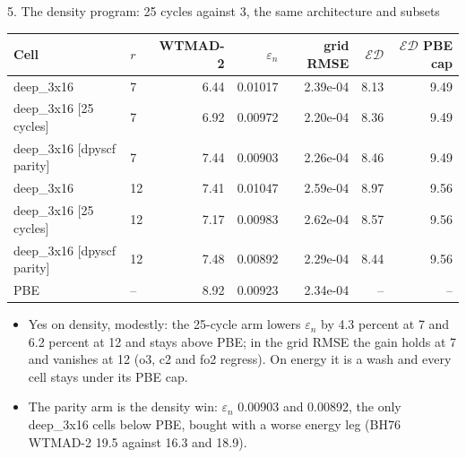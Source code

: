 \begin{frame}{5. The density program: 25 cycles against 3, the same architecture and subsets}
  \begin{center}\small\setlength{\tabcolsep}{4pt}
  \begin{tabular}{llrrrrr}
  \toprule
  Cell & $r$ & WTMAD-2 & $\varepsilon_n$ & grid RMSE & $\mathcal{ED}$ & $\mathcal{ED}$ PBE cap \\ \midrule
  deep\_3x16 & 7 & 6.44 & 0.01017 & 2.39e-04 & 8.13 & 9.49 \\
  deep\_3x16 [25 cycles] & 7 & 6.92 & 0.00972 & 2.20e-04 & 8.36 & 9.49 \\
  deep\_3x16 [dpyscf parity] & 7 & 7.44 & 0.00903 & 2.26e-04 & 8.46 & 9.49 \\
  deep\_3x16 & 12 & 7.41 & 0.01047 & 2.59e-04 & 8.97 & 9.56 \\
  deep\_3x16 [25 cycles] & 12 & 7.17 & 0.00983 & 2.62e-04 & 8.57 & 9.56 \\
  deep\_3x16 [dpyscf parity] & 12 & 7.48 & 0.00892 & 2.29e-04 & 8.44 & 9.56 \\
  PBE & -- & 8.92 & 0.00923 & 2.34e-04 & -- & -- \\
  \bottomrule
  \end{tabular}
  \end{center}
  \small
  \begin{itemize}
    \item Yes on density, modestly: the 25-cycle arm lowers $\varepsilon_n$ by 4.3 percent at 7 and 6.2 percent at 12 and stays above PBE; in the grid RMSE the gain holds at 7 and vanishes at 12 (o3, c2 and fo2 regress). On energy it is a wash and every cell stays under its PBE cap.
    \item The parity arm is the density win: $\varepsilon_n$ 0.00903 and 0.00892, the only deep\_3x16 cells below PBE, bought with a worse energy leg (BH76 WTMAD-2 19.5 against 16.3 and 18.9).
  \end{itemize}
\end{frame}
